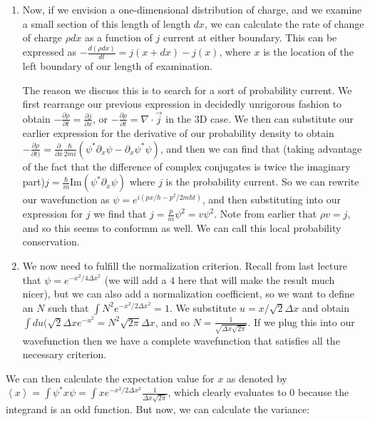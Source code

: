 \documentclass{report}
\begin{document}
\begin{enumerate}
\item Now, if we envision a one-dimensional distribution of charge, and we examine a small section of this length of length $dx$, we can calculate the rate of change of charge $\rho dx$ as a function of $j$ current at either boundary. This can be expressed as $-\frac{d(\rho dx)}{dt} = j(x + dx) - j(x)$, where $x$ is the location of the left boundary of our length of examination. 

    The reason we discuss this is to search for a sort of probability current. We first rearrange our previous expression in decidedly unrigorous fashion to obtain $-\frac{\partial \rho}{\partial t} = \frac{\partial j}{\partial x}$, or $-\frac{\partial \rho}{\partial t} = \nabla \cdot \vec{j}$ in the 3D case. We then can substitute our earlier expression for the derivative of our probability density to obtain $-\frac{\partial \rho}{\partial t)} = \frac{\partial}{\partial x}\frac{\hbar}{2mi}\left(\psi^*\partial_x\psi - \partial_x\psi^*\psi\right)$, and then we can find that (taking advantage of the fact that the difference of complex conjugates is twice the imaginary part)$j = \frac{\hbar}{m}\mathrm{Im}(\psi^*\partial_x\psi)$ where $j$ is the probability current. So we can rewrite our wavefunction as $\psi = e^{i(px/\hbar - p^2/2m\hbar t)}$, and then substituting into our expression for $j$ we find that $j = \frac{p}{m}\psi^2 = v\psi^2$. Note from earlier that $\rho v = j$, and so this seems to conformm as well. We can call this local probability conservation. 

\item We now need to fulfill the normalization criterion. Recall from last lecture that $\psi = e^{-x^2/4\Delta x^2}$ (we will add a $4$ here that will make the result much nicer), but we can also add a normalization coefficient, so we want to define an $N$ such that $\int{N^2 e^{-x^2/2\Delta x^2}} = 1$. We substitute $u = x/\sqrt{2}\Delta x$ and obtain $\int{du(\sqrt{2}\Delta xe^{-u^2}} = N^2 \sqrt{2\pi}\Delta x$, and so $N = \frac{1}{\sqrt{\Delta x\sqrt{2\pi}}}$. If we plug this into our wavefunction then we have a complete wavefunction that satisfies all the necessary criterion.
\end{enumerate}

We can then calculate the expectation value for $x$ as denoted by $\left<x\right> = \int{\psi^*x\psi} = \int{xe^{-x^2/2\Delta x^2} \frac{1}{\Delta x \sqrt{2\pi}}}$, which clearly evaluates to $0$ because the integrand is an odd function. But now, we can calculate the variance:
\end{document}
